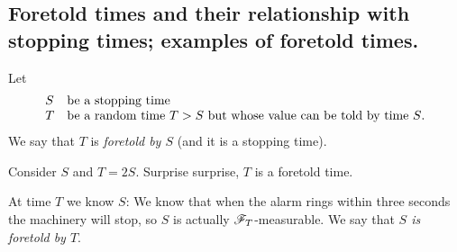\documentclass{report}
\begin{document}
\subsection{Foretold times and their relationship with stopping times; examples of foretold times.}
\begin{definition}
	Let 
	\begin{equation*}
		\begin{array}{l l}
			S &\text{be a stopping time}\\
			T &\text{be a random time $T>S$ but whose value can be told by time $S$.}
		\end{array}
	\end{equation*}
	We say that $T$ is \emph{foretold by $S$} (and it is a stopping time).
\end{definition}
\begin{example}
	Consider $S$ and $T=2S$. Surprise surprise, $T$ is a foretold time.
\end{example}
\begin{remark}
	At time $T$ we know $S$: We know that when the alarm rings within three seconds the machinery will stop, so $S$ is actually $\mathscr{F}_T$-measurable. We say that \emph{$S$ is foretold by $T$}.
\end{remark}
\end{document}
